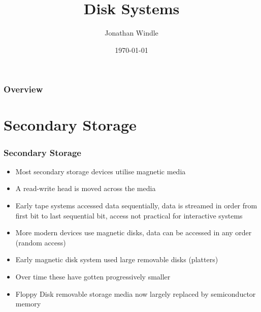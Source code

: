 \documentclass{beamer}
\title[Disk Systems]{Disk Systems} %
\author{Jonathan Windle} %
\institute[UEA] %
{
University of East Anglia \\ %
\medskip
\textit{J.Windle@uea.ac.uk} %
}
\date{\today} %
\begin{document}
\begin{frame}
\titlepage %
\end{frame}

\begin{frame}[allowframebreaks]
\frametitle{Overview} %
\tableofcontents %
\end{frame}

\section{Secondary Storage}
\begin{frame}
\frametitle{Secondary Storage}
\begin{itemize}
\item Most secondary storage devices utilise magnetic media
\item A read-write head is moved across the media
\item Early tape systems accessed data sequentially, data is streamed in order from first bit to last sequential bit, access not practical for interactive systems
\item More modern devices use magnetic disks, data can be accessed in any order (random access)
\item Early magnetic disk system used large removable disks (platters)
\item Over time these have gotten progressively smaller
\item Floppy Disk removable storage media now largely replaced by semiconductor memory
\end{itemize}
\end{frame}
\end{document}
